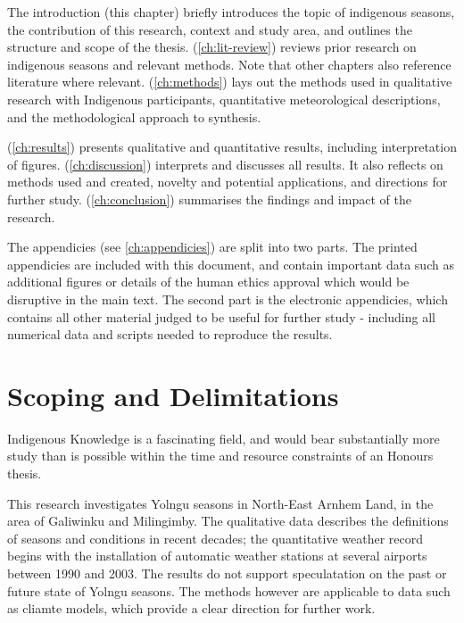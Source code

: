 The introduction (this chapter) briefly introduces the topic of
indigenous seasons, the contribution of this research, context and
study area, and outlines the structure and scope of the thesis.
%
 (\autoref{ch:lit-review}) reviews prior research
on indigenous seasons and relevant methods.  Note that other chapters
also reference literature where relevant.
%
 (\autoref{ch:methods}) lays out the methods used in
qualitative research with Indigenous participants, quantitative meteorological
descriptions, and the methodological approach to synthesis.

 (\autoref{ch:results}) presents qualitative and
quantitative results, including interpretation of figures.
%
 (\autoref{ch:discussion}) interprets and discusses
all results.  It also reflects on methods used and created, novelty and
potential applications, and directions for further study.
%
 (\autoref{ch:conclusion}) summarises the findings
and impact of the research.

The appendicies (see \autoref{ch:appendicies}) are split into two parts.
The printed appendicies are included with this document, and contain
important data such as additional figures or details of the human ethics
approval which would be disruptive in the main text.  The second part
is the electronic appendicies, which contains all other material judged to
be useful for further study - including all numerical data and scripts
needed to reproduce the results.



\section{Scoping and Delimitations}
Indigenous Knowledge is a fascinating field, and would bear substantially
more study than is possible within the time and resource constraints of
an Honours thesis.

This research investigates Yolngu seasons in North-East Arnhem Land, in
the area of Galiwinku and Milingimby.  The qualitative data describes the
definitions of seasons and conditions in recent decades; the quantitative
weather record begins with the installation of automatic weather stations
at several airports between 1990 and 2003.  The results do not support
speculatation on the past or future state of Yolngu seasons.  The methods
however are applicable to data such as cliamte models, which provide
a clear direction for further work.

